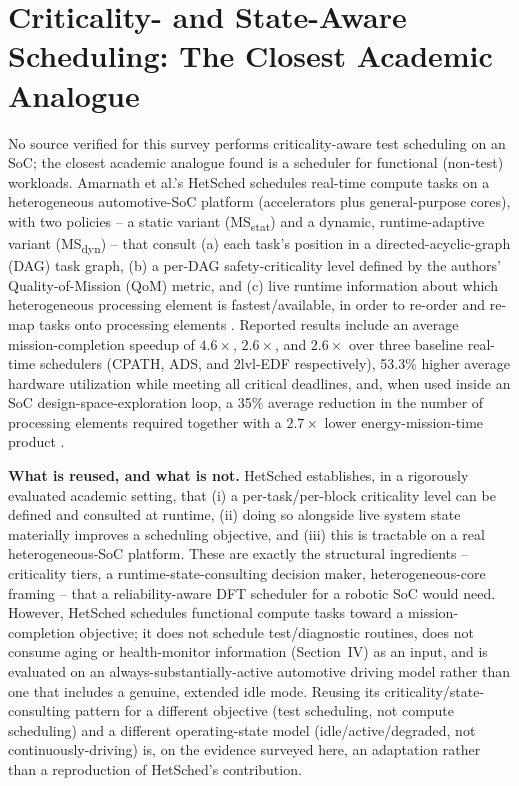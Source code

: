 \documentclass[journal]{IEEEtran}
\begin{document}
\section{Criticality- and State-Aware Scheduling: The Closest Academic Analogue}
No source verified for this survey performs criticality-aware test scheduling on an SoC; the closest academic analogue found is a scheduler for functional (non-test) workloads. Amarnath et al.'s HetSched schedules real-time compute tasks on a heterogeneous automotive-SoC platform (accelerators plus general-purpose cores), with two policies -- a static variant (MS\textsubscript{stat}) and a dynamic, runtime-adaptive variant (MS\textsubscript{dyn}) -- that consult (a) each task's position in a directed-acyclic-graph (DAG) task graph, (b) a per-DAG safety-criticality level defined by the authors' Quality-of-Mission (QoM) metric, and (c) live runtime information about which heterogeneous processing element is fastest/available, in order to re-order and re-map tasks onto processing elements \cite{r18}. Reported results include an average mission-completion speedup of $4.6\times$, $2.6\times$, and $2.6\times$ over three baseline real-time schedulers (CPATH, ADS, and 2lvl-EDF respectively), 53.3\% higher average hardware utilization while meeting all critical deadlines, and, when used inside an SoC design-space-exploration loop, a 35\% average reduction in the number of processing elements required together with a $2.7\times$ lower energy-mission-time product \cite{r18}.

\textbf{What is reused, and what is not.} HetSched establishes, in a rigorously evaluated academic setting, that (i) a per-task/per-block criticality level can be defined and consulted at runtime, (ii) doing so alongside live system state materially improves a scheduling objective, and (iii) this is tractable on a real heterogeneous-SoC platform. These are exactly the structural ingredients -- criticality tiers, a runtime-state-consulting decision maker, heterogeneous-core framing -- that a reliability-aware DFT scheduler for a robotic SoC would need. However, HetSched schedules functional compute tasks toward a mission-completion objective; it does not schedule test/diagnostic routines, does not consume aging or health-monitor information (Section~IV) as an input, and is evaluated on an always-substantially-active automotive driving model rather than one that includes a genuine, extended idle mode. Reusing its criticality/state-consulting pattern for a different objective (test scheduling, not compute scheduling) and a different operating-state model (idle/active/degraded, not continuously-driving) is, on the evidence surveyed here, an adaptation rather than a reproduction of HetSched's contribution.
\end{document}
